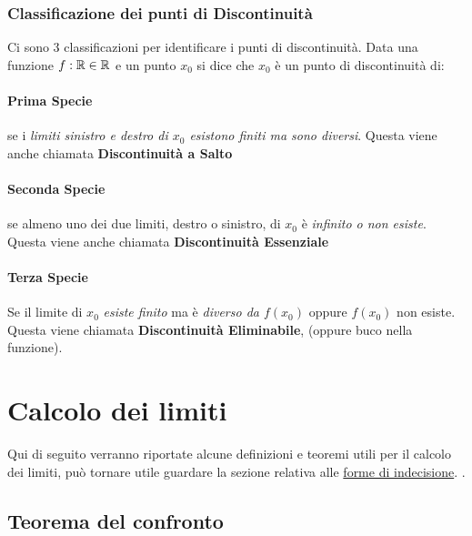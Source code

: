 \subsubsection*{Classificazione dei punti di Discontinuità}
Ci sono 3 classificazioni per identificare i punti di discontinuità.
Data una funzione $f:\mathbb{R} \in \mathbb{R}$ e un punto $x_0$ si dice che $x_0$ è un punto di discontinuità di:
\paragraph{Prima Specie} se i \emph{limiti sinistro e destro di $x_0$ esistono finiti ma sono diversi}.
Questa viene anche chiamata \textbf{Discontinuità a Salto}
\paragraph{Seconda Specie} se almeno uno dei due limiti, destro o sinistro, di $x_0$ è \emph{infinito o non esiste}.
Questa viene anche chiamata \textbf{Discontinuità Essenziale}
\paragraph{Terza Specie} Se il limite di $x_0$ \emph{esiste finito} ma è \emph{diverso da $f(x_0)$} oppure $f(x_0)$ non esiste.
Questa viene chiamata \textbf{Discontinuità Eliminabile}, (oppure buco nella funzione).
\section{Calcolo dei limiti}
Qui di seguito verranno riportate alcune definizioni e teoremi utili per il calcolo 
dei limiti, può tornare utile guardare la sezione relativa alle
\hyperref[sec:forme_di_indecisione]{forme di indecisione}. 
. 
\subsection*{Teorema del confronto}
